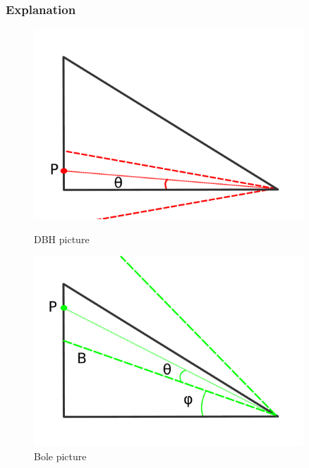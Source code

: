 \subsubsection{Explanation}
\begin{figure}[!htb]
		\centering
  		\includegraphics[width=0.9\textwidth]{triangle1.pdf}
	  	\caption{DBH picture}
	  	\label{triangle1}
	\endminipage\hfill
		\centering
	  	\includegraphics[width=0.9\textwidth]{triangle2.pdf}
	  	\caption{Bole picture}
	  	\label{triangle2}
	\endminipage\hfill
\end{figure}

